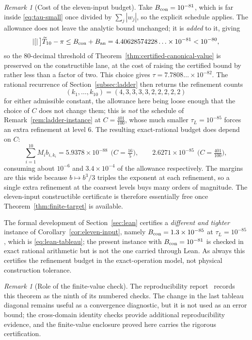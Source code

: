 \documentclass[12pt]{article}
\theoremstyle{definition}
\theoremstyle{remark}
\newtheorem{remark}[theorem]{Remark}
\newcommand{\abs}[1]{\left|#1\right|}
\begin{document}
\begin{remark}[Cost of the eleven-input budget]
\label{rem:eleven-instance}
Take $B_{\rm con}=10^{-81}$, which is far inside \eqref{eq:tau-small} once
divided by $\sum_j\abs{w_j}$, so the explicit schedule applies.  The allowance
does not leave the analytic bound unchanged; it is \emph{added} to it, giving
\[
  \abs[\big]{\widetilde T_{10}-\pi}
  \le B_{\rm con}+B_{\rm an}
  =4.40628574228\ldots\times10^{-81}
  <10^{-80},
\]
so the $80$-decimal threshold of
Theorem~\ref{thm:certified-canonical-value} is preserved on the constructible
lane, at the cost of raising the certified bound by rather less than a factor of
two.  This choice gives $\tau=7.7808\ldots\times10^{-82}$.  The rational
recurrence of
Section~\ref{subsec:ladder} then returns the refinement counts
\[
  (k_1,\ldots,k_{10})=(4,3,3,3,3,2,2,2,2,2)
\]
for either admissible constant, the allowance here being loose enough that the
choice of $C$ does not change them; this is \emph{not} the schedule of
Remark~\ref{rem:ladder-instance} at $C=\tfrac{401}{100}$, whose much smaller
$\tau_L=10^{-85}$ forces an extra refinement at level $6$.  The resulting
exact-rational budget does depend on $C$:
\[
  \sum_{i=1}^{10}M_ib_{i,k_i}
  =5.9378\times10^{-88}\ \ \bigl(C=\tfrac{16}{5}\bigr),
  \qquad
  2.6271\times10^{-85}\ \ \bigl(C=\tfrac{401}{100}\bigr),
\]
consuming about $10^{-6}$ and $3.4\times10^{-4}$ of the allowance
respectively.  The margins are this wide because $b\mapsto b^3/3$ triples the
exponent at each refinement, so a single extra refinement at the coarsest
levels buys many orders of magnitude.  The eleven-input constructible
certificate is therefore essentially free once
Theorem~\ref{thm:finite-target} is available.

The formal development of Section~\ref{sec:lean} certifies a \emph{different and
tighter} instance of Corollary~\ref{cor:eleven-input}, namely
$B_{\rm con}=1.3\times10^{-85}$ at $\tau_L=10^{-85}$, which is
\eqref{eq:lean-tableau}; the present instance with $B_{\rm con}=10^{-81}$ is
checked in exact rational arithmetic but is not the one carried through Lean.
As always this certifies the refinement budget in the exact-operation model,
not physical construction tolerance.
\end{remark}

\begin{remark}[Role of the finite-value check]
The reproducibility report~\cite{baker-certification} records this theorem as
the ninth of its numbered checks.  The change in the last tableau diagonal
remains useful as a convergence diagnostic, but it is not used as an error
bound; the cross-domain identity checks provide additional reproducibility
evidence, and the finite-value enclosure proved here carries the rigorous
certification.
\end{remark}
\end{document}
